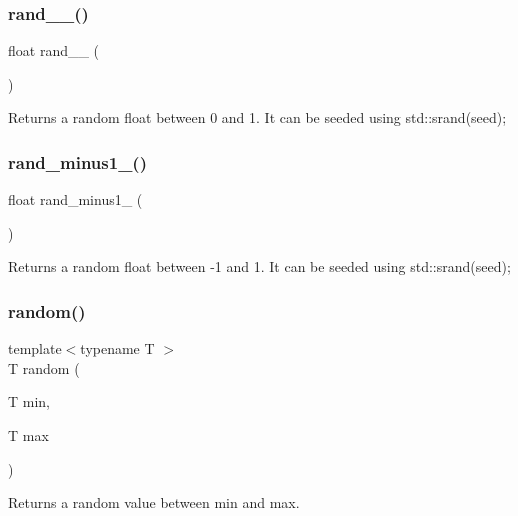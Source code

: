 \subsubsection{\texorpdfstring{rand\+\_\+\_()}{rand\_0\_1()}}
{\footnotesize\ttfamily float rand\+\_\+\_ (\begin{DoxyParamCaption}{ }\end{DoxyParamCaption})\hspace{0.3cm}{\ttfamily [inline]}}

Returns a random float between 0 and 1. It can be seeded using std\+::srand(seed); \mbox{\label{group__base_ga797b895e22eea2306c62d82f3cf39fa0}} 
\subsubsection{\texorpdfstring{rand\+\_\+minus1\+\_()}{rand\_minus1\_1()}}
{\footnotesize\ttfamily float rand\+\_\+minus1\+\_ (\begin{DoxyParamCaption}{ }\end{DoxyParamCaption})\hspace{0.3cm}{\ttfamily [inline]}}

Returns a random float between -\/1 and 1. It can be seeded using std\+::srand(seed); \mbox{\label{group__base_ga2b4200418788b03a7f38acd502ddd67f}} 
\subsubsection{\texorpdfstring{random()}{random()}\hspace{0.1cm}{\footnotesize\ttfamily [1/2]}}
{\footnotesize\ttfamily template$<$typename T $>$ \\
T random (\begin{DoxyParamCaption}\item[{T}]{min,  }\item[{T}]{max }\end{DoxyParamCaption})\hspace{0.3cm}{\ttfamily [inline]}}

Returns a random value between {\ttfamily min} and {\ttfamily max}. \mbox{\label{group__base_ga84e4437f43bda4dd8f4cabda651f8eb7}} 
